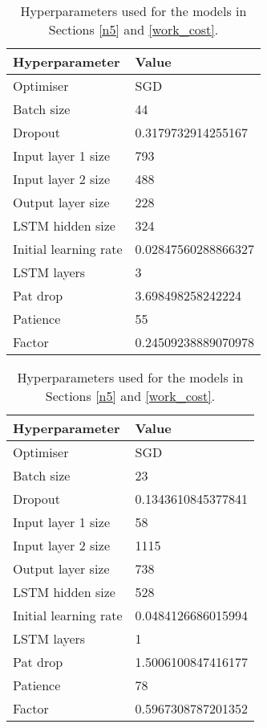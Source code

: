 \begin{table}[h]
	\centering
	\begin{tabular}{l | l}
		Hyperparameter & Value \\
		\hline
		Optimiser & SGD \\
		Batch size & 44 \\
		Dropout & 0.3179732914255167 \\
		Input layer 1 size & 793 \\
		Input layer 2 size & 488 \\
		Output layer size & 228 \\
		LSTM hidden size & 324 \\
		Initial learning rate & 0.02847560288866327 \\
		LSTM layers & 3 \\
		Pat drop & 3.698498258242224 \\
		Patience & 55 \\
		Factor & 0.24509238889070978
	\end{tabular}
	\caption{Hyperparameters used for the models in Sections \ref{n5} and \ref{work_cost}.}
	\label{hyperparams_n_5}
\end{table}

\begin{table}[h]
	\centering
	\begin{tabular}{l | l}
		Hyperparameter & Value \\
		\hline
		Optimiser & SGD \\
		Batch size & 23 \\
		Dropout & 0.1343610845377841 \\
		Input layer 1 size & 58 \\
		Input layer 2 size & 1115 \\
		Output layer size & 738 \\
		LSTM hidden size & 528 \\
		Initial learning rate & 0.0484126686015994 \\
		LSTM layers & 1 \\
		Pat drop & 1.5006100847416177 \\
		Patience & 78 \\
		Factor & 0.5967308787201352
	\end{tabular}
	\caption{Hyperparameters used for the models in Sections \ref{n5} and \ref{work_cost}.}
	\label{hyperparams_work_cost}
\end{table}